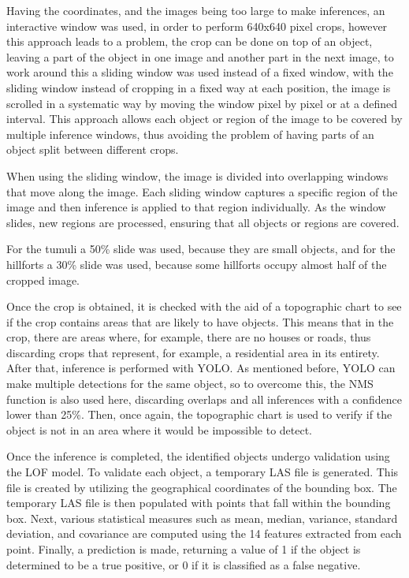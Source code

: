 Having the coordinates, and the images being too large to make inferences, an interactive window was used, in order to perform 640x640 pixel crops, however this approach leads to a problem, the crop can be done on top of an object, leaving a part of the object in one image and another part in the next image, to work around this a sliding window was used instead of a fixed window, with the sliding window instead of cropping in a fixed way at each position, the image is scrolled in a systematic way by moving the window pixel by pixel or at a defined interval. This approach allows each object or region of the image to be covered by multiple inference windows, thus avoiding the problem of having parts of an object split between different crops.

When using the sliding window, the image is divided into overlapping windows that move along the image. Each sliding window captures a specific region of the image and then inference is applied to that region individually. As the window slides, new regions are processed, ensuring that all objects or regions are covered.

For the tumuli a 50\% slide was used, because they are small objects, and for the hillforts a 30\% slide was used, because some hillforts occupy almost half of the cropped image.

Once the crop is obtained, it is checked with the aid of a topographic chart to see if the crop contains areas that are likely to have objects. This means that in the crop, there are areas where, for example, there are no houses or roads, thus discarding crops that represent, for example, a residential area in its entirety. After that, inference is performed with YOLO. As mentioned before, YOLO can make multiple detections for the same object, so to overcome this, the NMS function is also used here, discarding overlaps and all inferences with a confidence lower than 25\%. Then, once again, the topographic chart is used to verify if the object is not in an area where it would be impossible to detect.

Once the inference is completed, the identified objects undergo validation using the LOF model. To validate each object, a temporary LAS file is generated. This file is created by utilizing the geographical coordinates of the bounding box. The temporary LAS file is then populated with points that fall within the bounding box. Next, various statistical measures such as mean, median, variance, standard deviation, and covariance are computed using the 14 features extracted from each point. Finally, a prediction is made, returning a value of 1 if the object is determined to be a true positive, or 0 if it is classified as a false negative.

